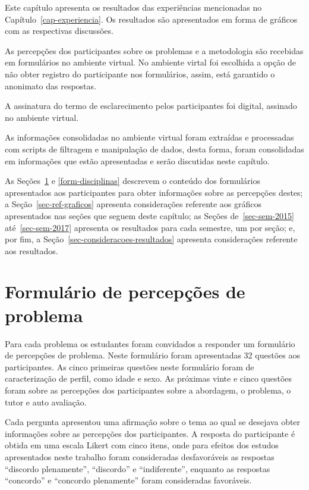 \acresetall

Este capítulo apresenta os resultados das experiências
mencionadas no Capítulo~\ref{cap-experiencia}.
Os resultados são apresentados em forma de gráficos com
as respectivas discussões.

As percepções dos participantes sobre os problemas e a metodologia
são recebidas em formulários no ambiente virtual.
No ambiente virtal foi escolhida a opção de não
obter registro do participante nos formulários, assim,
está garantido o anonimato das respostas.

A assinatura do termo de esclarecimento pelos participantes foi
digital, assinado no ambiente virtual.

As informações consolidadas no ambiente virtual foram
extraídas e processadas com scripts de filtragem e manipulação de dados,
desta forma, foram consolidadas em informações que estão apresentadas
e serão discutidas neste capítulo.

As Seções~\ref{form-percepcoes} e \ref{form-disciplinas} descrevem
o conteúdo dos formulários apresentados aos participantes para obter
informações sobre as percepções destes;
a Seção~\ref{sec-ref-graficos} apresenta considerações referente aos
gráficos apresentados nas seções que seguem deste capítulo;
as Seções de~\ref{sec-sem-2015} até~\ref{sec-sem-2017}
apresenta os resultados para cada semestre, um por seção;
e, por fim, a Seção~\ref{sec-consideracoes-resultados} apresenta
considerações referente aos resultados.

\section{Formulário de percepções de problema}
\label{form-percepcoes}
Para cada problema os estudantes foram convidados a responder um formulário de percepções de problema.
Neste formulário foram apresentadas 32 questões aos participantes.
As cinco primeiras questões neste formulário foram de caracterização de perfil, como
idade e sexo.
As próximas vinte e cinco questões foram sobre as percepções dos participantes sobre a abordagem, o
problema, o tutor e auto avaliação.

Cada pergunta apresentou uma afirmação sobre o tema ao qual se desejava obter informações sobre as
percepções dos participantes.
A resposta do participante é obtida em uma escala Likert com cinco itens, onde para efeitos dos estudos
apresentados neste trabalho foram consideradas desfavoráveis
as respostas ``discordo plenamente'', ``discordo'' e ``indiferente'', enquanto as
respostas ``concordo'' e ``concordo plenamente'' foram consideradas favoráveis.

